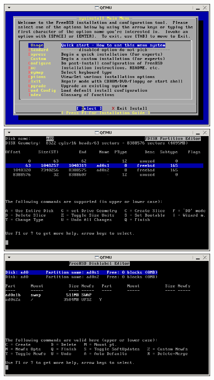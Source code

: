 \documentclass[mingoth,a4paper]{jsarticle}
\begin{document}
{{{{{\begin{figure}[H]
 \begin{multicols}{2}
 \includegraphics[width=\hsize]{image200708/kfreebsd-install-0.png}
 \includegraphics[width=\hsize]{image200708/kfreebsd-install-1.png}
 \includegraphics[width=\hsize]{image200708/kfreebsd-install-2.png}

\end{multicols}
\end{figure}}}}}}
\end{document}
